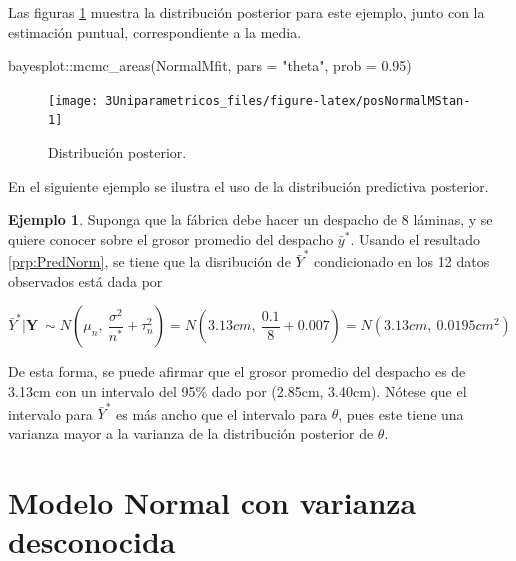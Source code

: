 \documentclass[
  10pt,
  spanish,
]{book}
\newenvironment{Shaded}{\begin{snugshade}}{\end{snugshade}}
\newcommand{\AttributeTok}[1]{\textcolor[rgb]{0.77,0.63,0.00}{#1}}
\newcommand{\FloatTok}[1]{\textcolor[rgb]{0.00,0.00,0.81}{#1}}
\newcommand{\FunctionTok}[1]{\textcolor[rgb]{0.00,0.00,0.00}{#1}}
\newcommand{\NormalTok}[1]{#1}
\newcommand{\SpecialCharTok}[1]{\textcolor[rgb]{0.00,0.00,0.00}{#1}}
\newcommand{\StringTok}[1]{\textcolor[rgb]{0.31,0.60,0.02}{#1}}
\theoremstyle{definition}
\theoremstyle{definition}
\newtheorem{example}{Ejemplo}[chapter]
\theoremstyle{definition}
\theoremstyle{definition}
\theoremstyle{remark}
\begin{document}
Las figuras \ref{fig:posNormalMStan} muestra la distribución posterior para este ejemplo, junto con la estimación puntual, correspondiente a la media.

\begin{Shaded}
\begin{Highlighting}[]
\NormalTok{bayesplot}\SpecialCharTok{::}\FunctionTok{mcmc\_areas}\NormalTok{(NormalMfit, }\AttributeTok{pars =} \StringTok{"theta"}\NormalTok{, }
                      \AttributeTok{prob =} \FloatTok{0.95}\NormalTok{)}
\end{Highlighting}
\end{Shaded}

\begin{figure}

{\centering \texttt{[image: 3Uniparametricos\_files/figure-latex/posNormalMStan-1]} 

}

\caption{Distribución posterior.}\label{fig:posNormalMStan}
\end{figure}

En el siguiente ejemplo se ilustra el uso de la distribución predictiva posterior.

\begin{example}
\protect\hypertarget{exm:unnamed-chunk-76}{}{\label{exm:unnamed-chunk-76} }Suponga que la fábrica debe hacer un despacho de 8 láminas, y se quiere conocer sobre el grosor promedio del despacho \(\bar{y}^*\). Usando el resultado \ref{prp:PredNorm}, se tiene que la disribución de \(\bar{Y}^*\) condicionado en los 12 datos observados está dada por

\begin{equation*}
\bar{Y}^*|\mathbf{Y}\ \sim N\left(\mu_n,\ \frac{\sigma^2}{n^*}+\tau^2_n\right) = N\left(3.13cm,\ \frac{0.1}{8}+0.007\right) = N(3.13cm,\ 0.0195cm^2)
\end{equation*}

De esta forma, se puede afirmar que el grosor promedio del despacho es de 3.13cm con un intervalo del 95\% dado por (2.85cm, 3.40cm). Nótese que el intervalo para \(\bar{Y}^{*}\) es más ancho que el intervalo para \(\theta\), pues este tiene una varianza mayor a la varianza de la distribución posterior de \(\theta\).
\end{example}

\hypertarget{modelo-normal-con-varianza-desconocida}{%
\section{Modelo Normal con varianza desconocida}\label{modelo-normal-con-varianza-desconocida}}
\end{document}
